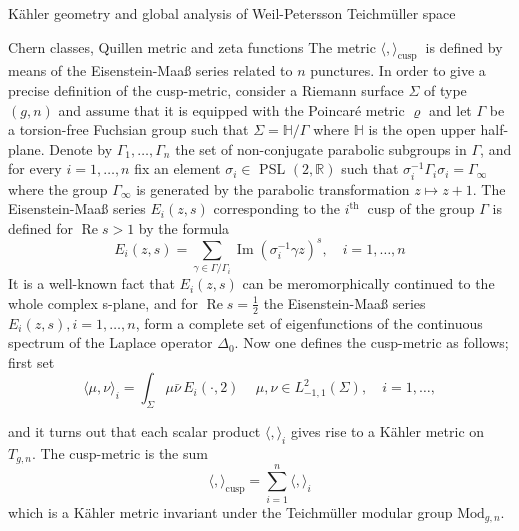 \documentclass[12pt]{amsart}
\theoremstyle{plain}
\theoremstyle{definition}
\theoremstyle{remark}
\numberwithin{equation}{section} %
\numberwithin{figure}{section} %
\begin{document}
\begin{section}{K\"ahler geometry and global analysis of Weil-Petersson Teichm\"uller space}
\begin{subsection}{Chern classes, Quillen metric and zeta functions}
The metric \(\langle,\rangle_{\text {cusp }}\)
is defined by means of the Eisenstein-Maa{\ss} series related to \(n\) punctures. In order to give a precise definition of the cusp-metric, consider a Riemann surface \(\Sigma\) of type \((g, n)\) and assume that it is
equipped with the Poincaré metric \(\varrho\) and let \(\Gamma\) be a torsion-free Fuchsian group
 such that $\Sigma= \mathbb{H}/\Gamma$ where \(\mathbb{H}\) is the open upper half-plane. Denote by \(\Gamma_{1}, \ldots, \Gamma_{n}\) the set of non-conjugate parabolic subgroups in \(\Gamma\),
and for every \(i=1, \ldots, n\) fix an element \(\sigma_{i} \in\) PSL \((2, \mathbb{R})\) such that \(\sigma_{i}^{-1} \Gamma_{i} \sigma_{i}=\Gamma_{\infty}\)
where the group \(\Gamma_{\infty}\) is generated by the parabolic transformation \(z \mapsto z+1\). The Eisenstein-Maa{\ss} series \(E_{i}(z, s)\) corresponding to the \(i^{\text {th }}\) cusp of the group \(\Gamma\) is
defined for \(\operatorname{Re} s>1\) by the formula
$$
E_{i}(z, s)=\sum_{\gamma \in \Gamma/\Gamma_{i}} \operatorname{Im}\left(\sigma_{i}^{-1} \gamma z\right)^{s}, \quad i=1, \ldots, n
$$
It is a well-known fact that $E_{i}(z, s)$ can be meromorphically continued to the whole complex s-plane, and for
\(\operatorname{Re} s=\frac{1}{2}\) the Eisenstein-Maa{\ss} series \(E_{i}(z, s), i=1, \ldots, n\), form a complete set of
eigenfunctions of the continuous spectrum of the Laplace operator \(\Delta_{0}\). 
Now one defines the cusp-metric as follows; first set 
\begin{equation}
\langle\mu, \nu\rangle_{i}=\int_{\Sigma} \mu \bar{\nu}\, E_{i}(\cdot, 2)\, \quad \mu, \nu \in L^2_{-1,1}(\Sigma), \quad i=1, \ldots, 
\end{equation}

and it turns out that each scalar product $\langle,\rangle_{i}$ gives rise to a Kähler metric on $T_{g, n}$. The cusp-metric is the sum
\begin{equation}
\langle,\rangle_{\operatorname{cusp}}=\sum_{i=1}^{n}\langle,\rangle_{i}
\end{equation}
which is a K\"ahler metric invariant under the Teichmüller
modular group $\mathrm{Mod}_{g, n}.$
\\


\end{subsection}
\end{section}
\end{document}
